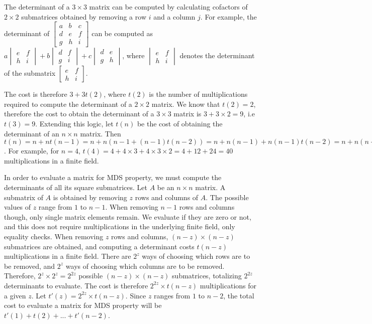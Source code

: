 The determinant of a $3 \times 3$ matrix can be computed by calculating cofactors of $2 \times 2$ submatrices obtained by removing a row $i$ and a column $j$. For example, the determinant of $\begin{bmatrix}a & b & c\\d & e & f\\g & h & i\end{bmatrix}$ can be computed as $a \begin{vmatrix}e & f\\h & i \end{vmatrix} + b \begin{vmatrix}d & f\\ g & i\end{vmatrix} + c \begin{vmatrix}d & e\\g & h\end{vmatrix}$, where $\begin{vmatrix}e & f\\h & i \end{vmatrix}$ denotes the determinant of the submatrix $\begin{bmatrix}e & f\\h & i \end{bmatrix}$.

The cost is therefore $3 + 3t(2)$, where $t(2)$ is the number of multiplications required to compute the determinant of a $2\times2$ matrix. We know that $t(2) = 2$, therefore the cost to obtain the determinant of a $3\times3$ matrix is $3+3\times2 = 9$, i.e $t(3) = 9$. Extending this logic, let $t(n)$ be the cost of obtaining the determinant of an $n\times n$ matrix. Then $t(n) = n + nt(n-1) = n + n(n-1 + (n-1) t(n-2)) = n + n(n-1) + n(n-1)t(n-2) = n + n(n-1) + n(n-1)(n-2) + ... + n(n-1)(n-2)..2$. For example, for $n = 4$, $t(4) = 4 + 4\times3 + 4\times3\times2 = 4 + 12 + 24 = 40$ multiplications in a finite field.

In order to evaluate a matrix for MDS property, we must compute the determinants of all its square submatrices. Let $A$ be an $n \times n$ matrix. A submatrix of $A$ is obtained by removing $z$ rows and columns of $A$. The possible values of $z$ range from $1$ to $n - 1$. When removing $n-1$ rows and columns though, only single matrix elements remain. We evaluate if they are zero or not, and this does not require multiplications in the underlying finite field, only equality checks. When removing $z$ rows and columns, $(n - z) \times (n - z)$ submatrices are obtained, and computing a determinant costs $t(n-z)$ multiplications in a finite field. There are $2^z$ ways of choosing which rows are to be removed, and $2^z$ ways of choosing which columns are to be removed. Therefore, $2^z \times 2^z = 2^{2z}$ possible $(n - z) \times (n - z)$ submatrices, totalizing $2^{2z}$ determinants to evaluate. The cost is therefore $2^{2z}\times t(n-z)$ multiplications for a given $z$. Let $t'(z) = 2^{2z} \times t(n-z)$. Since $z$ ranges from $1$ to $n-2$, the total cost to evaluate a matrix for MDS property will be $t'(1) + t(2) + ... + t'(n-2)$.

